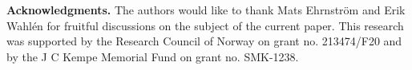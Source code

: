 

\textbf{Acknowledgments.}
The authors would like to thank Mats Ehrnström and Erik Wahlén
for fruitful discussions on the subject of the current paper. 
This research was supported by the Research Council of Norway on grant no. 213474/F20
and by the J C Kempe Memorial Fund on grant no. SMK-1238.







%
%
%
%
